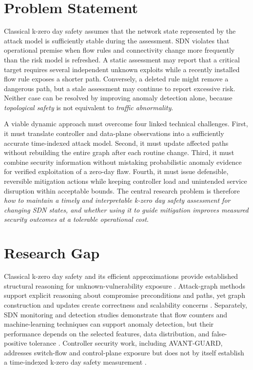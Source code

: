 \documentclass[12pt,a4paper,oneside]{article}
\begin{document}
\section{Problem Statement}\label{sec:problem}
Classical k-zero day safety assumes that the network state represented by the attack model is sufficiently stable during the assessment. SDN violates that operational premise when flow rules and connectivity change more frequently than the risk model is refreshed. A static assessment may report that a critical target requires several independent unknown exploits while a recently installed flow rule exposes a shorter path. Conversely, a deleted rule might remove a dangerous path, but a stale assessment may continue to report excessive risk. Neither case can be resolved by improving anomaly detection alone, because \emph{topological safety} is not equivalent to \emph{traffic abnormality}.

A viable dynamic approach must overcome four linked technical challenges. First, it must translate controller and data-plane observations into a sufficiently accurate time-indexed attack model. Second, it must update affected paths without rebuilding the entire graph after each routine change. Third, it must combine security information without mistaking probabilistic anomaly evidence for verified exploitation of a zero-day flaw. Fourth, it must issue defensible, reversible mitigation actions while keeping controller load and unintended service disruption within acceptable bounds. The central research problem is therefore \emph{how to maintain a timely and interpretable k-zero day safety assessment for changing SDN states, and whether using it to guide mitigation improves measured security outcomes at a tolerable operational cost}.

\section{Research Gap}\label{sec:gap}
Classical k-zero day safety and its efficient approximations provide established structural reasoning for unknown-vulnerability exposure \cite{wang2010kzero,wang2014kzero,albanese2013efficient}. Attack-graph methods support explicit reasoning about compromise preconditions and paths, yet graph construction and updates create correctness and scalability concerns \cite{zenitani2023attack,lallie2020review}. Separately, SDN monitoring and detection studies demonstrate that flow counters and machine-learning techniques can support anomaly detection, but their performance depends on the selected features, data distribution, and false-positive tolerance \cite{dey2020sdn,sultana2019survey,faezi2023survey}. Controller security work, including AVANT-GUARD, addresses switch-flow and control-plane exposure but does not by itself establish a time-indexed k-zero day safety measurement \cite{shin2013avantguard}.
\end{document}
